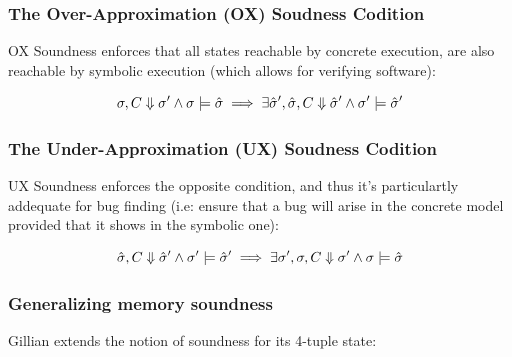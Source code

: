 \documentclass[11pt]{article}
\begin{document}
\subsubsection*{The Over-Approximation (OX) Soudness Codition}

OX Soundness enforces that all states reachable by concrete execution, are also reachable by symbolic execution (which allows for verifying software):

\[
\sigma, C \Downarrow \sigma' \wedge \sigma \models \hat{\sigma} \implies \exists \hat{\sigma}', \hat{\sigma},C \Downarrow \hat{\sigma}' \wedge \sigma' \models \hat{\sigma}' 
\]

\subsubsection*{The Under-Approximation (UX) Soudness Codition}

UX Soundness enforces the opposite condition, and thus it's particulartly addequate for bug finding (i.e: ensure that a bug will arise in the concrete model provided that it shows in the symbolic one):

\[
\hat{\sigma},C \Downarrow \hat{\sigma}' \wedge \sigma' \models \hat{\sigma}' \implies \exists \sigma',  \sigma, C \Downarrow \sigma' \wedge \sigma \models \hat{\sigma} 
\]

\subsubsection*{Generalizing memory soundness}

Gillian extends the notion of soundness for its 4-tuple state:
\end{document}

